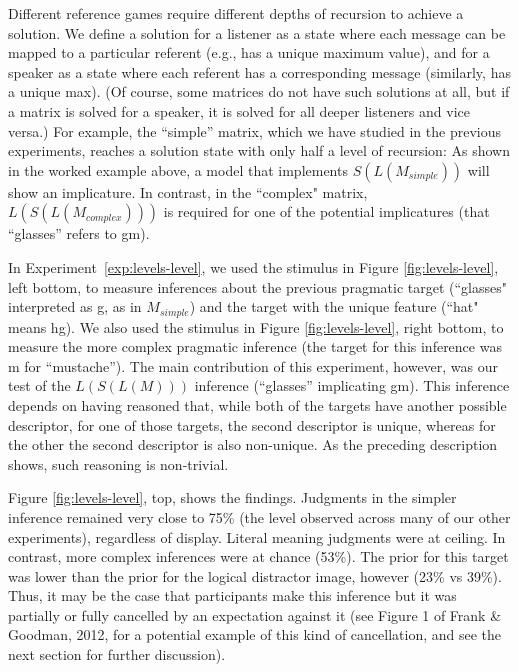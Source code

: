 \documentclass[man]{apa6}
\newcounter{Experiment}
\newcommand{\exptref}[1]{Experiment~\ref{#1}}
\begin{document}
Different reference games require different depths of recursion to achieve a solution. We define a solution for a listener as a state where each message can be mapped to a particular referent (e.g., has a unique maximum value), and for a speaker as a state where each referent has a corresponding message (similarly, has a unique max). (Of course, some matrices do not have such solutions at all, but if a matrix is solved for a speaker, it is solved for all deeper listeners and vice versa.) For example, the ``simple'' matrix, which we have studied in the previous experiments, reaches a solution state with only half a level of recursion: As shown in the worked example above, a model that implements $S(L(M_{simple}))$ will show an implicature. In contrast, in the ``complex" matrix, $L(S(L(M_{complex})))$ is required for one of the potential implicatures (that ``glasses'' refers to {\sc gm}).

In \exptref{exp:levels-level}, we used the stimulus in Figure \ref{fig:levels-level}, left bottom, to measure inferences about the previous pragmatic target (``glasses" interpreted as {\sc g}, as in $M_{simple}$) and the target with the unique feature (``hat" means {\sc hg}). We also used the stimulus in Figure \ref{fig:levels-level}, right bottom, to measure the more complex pragmatic inference (the target for this inference was {\sc m} for ``mustache''). The main contribution of this experiment, however, was our test of the $L(S(L(M)))$ inference (``glasses'' implicating {\sc gm}). This inference depends on having reasoned that, while both of the targets have another possible descriptor, for one of those targets, the second descriptor is unique, whereas for the other the second descriptor is also non-unique. As the preceding description shows, such reasoning is non-trivial.

Figure \ref{fig:levels-level}, top, shows the findings. Judgments in the simpler inference remained very close to 75\% (the level observed across many of our other experiments), regardless of display. Literal meaning judgments were at ceiling. In contrast, more complex inferences were at chance (53\%). The prior for this target was lower than the prior for the logical distractor image, however (23\% vs 39\%). Thus, it may be the case that participants make this inference but it was partially or fully cancelled  by an expectation against it (see Figure 1 of Frank \& Goodman, 2012, for a potential example of this kind of cancellation, and see the next section for further discussion).
\end{document}
